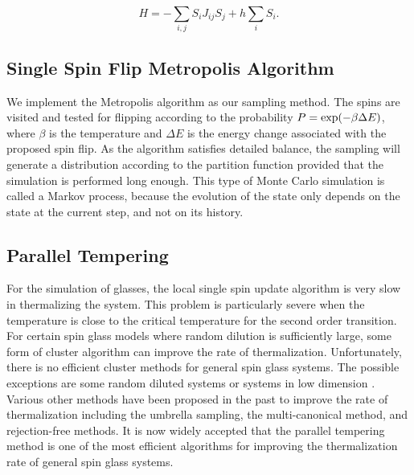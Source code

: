 \begin{equation}
H = - \sum_{i,j} S_i J_{ij} S_j + h \sum_{i} S_i.
\end{equation}


\subsection{Single Spin Flip Metropolis Algorithm}

We implement the Metropolis algorithm as our sampling method. The spins are 
visited and tested for flipping according to the probability $P = \mathrm{exp}(-\beta\Delta E)$,
where $\beta$ is the temperature and $\Delta E$ is the energy change associated 
with the proposed spin flip. As the algorithm satisfies detailed balance, the sampling 
will generate a distribution according to the partition function provided that the 
simulation is performed long enough.  This type of Monte Carlo simulation is
called a Markov process, because the evolution of the state only depends on the state 
at the current step, and not on its history. 

\subsection{Parallel Tempering}
\label{sec:PT}
For the simulation of glasses, the local single spin 
update algorithm is very slow in thermalizing the system. This problem is particularly 
severe when the temperature is close to the critical temperature for the second order 
transition. For certain spin glass models where random dilution is sufficiently 
large, some form of cluster algorithm can improve the rate of thermalization. Unfortunately, 
there is no efficient cluster methods for general spin glass systems. The possible exceptions are 
some random diluted systems or systems in low dimension 
\cite{Houdayer-2001,Liang-1992,Jorg-2005}. Various other methods have been proposed 
in the past to improve the rate of thermalization including the umbrella sampling, 
the multi-canonical method, and rejection-free methods. It is now widely accepted that 
the parallel tempering method is one of the most efficient algorithms for improving 
the thermalization rate of general spin glass systems.

